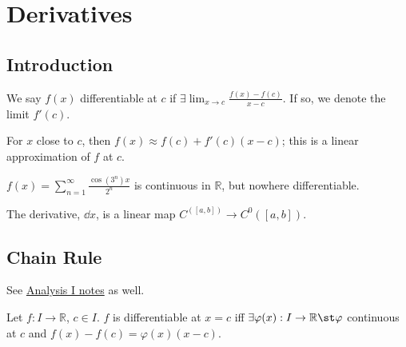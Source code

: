 \section{Derivatives}
\subsection{Introduction}

\begin{definition}[Differentiable]
    We say $f(x)$ differentiable at $c$ if $\exists \lim_{x \to c} \frac{f(x) - f(c)}{x-c}$. If so, we denote the limit $f'(c)$.
\end{definition}

\begin{remark}
    For $x$ close to $c$, then $f(x) \approx f(c) + f'(c)(x-c)$; this is a linear approximation of $f$ at $c$.
\end{remark}

\begin{example}[Weierstrass]
    $f(x) = \sum_{n=1}^\infty \frac{\cos(3^n)x}{2^n}$ is continuous in $\mathbb{R}$, but nowhere differentiable.
\end{example}
\begin{definition}
    The derivative, $\dd{x}$, is a linear map $C^([a, b]) \to C^0([a, b])$.
\end{definition}

\subsection{Chain Rule}
\begin{remark}
    See \href{https://notes.louismeunier.net/Analysis%201/analysis.pdf#page=96}{Analysis I notes} as well.
\end{remark}
\begin{theorem}\label{thm:Caratheodory}
    Let $f: I \to \mathbb{R}$, $c \in I$. $f$ is differentiable at $x = c$ iff $\exists \varphi(x) : I \to \mathbb{R} \st \varphi$ continuous at $c$ and $f(x) - f(c) = \varphi(x)(x - c)$.\footnotemark
\end{theorem}


